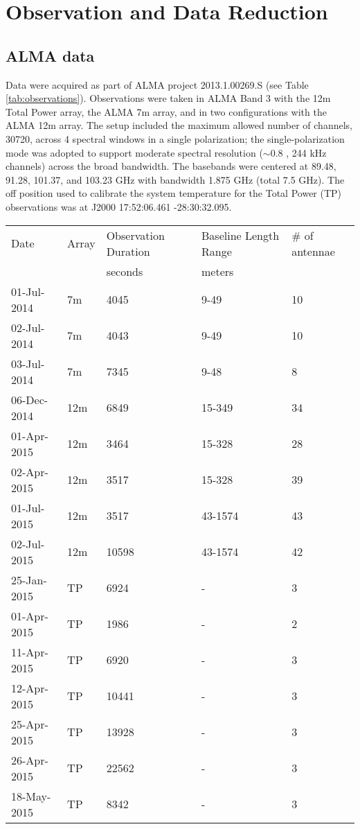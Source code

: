 \documentclass[twocolumn]{aastex61}
\begin{document}
\section{Observation and Data Reduction}
\label{sec:observations}
\subsection{ALMA data}
Data were acquired as part of ALMA project 2013.1.00269.S (see Table
\ref{tab:observations}).  Observations were taken in ALMA Band 3 with the 12m
Total Power array, the ALMA 7m array, and in two
configurations with the ALMA 12m array.  The setup included the maximum allowed
number of channels, 30720, across 4 spectral windows in a single polarization;
the single-polarization mode was adopted to support moderate spectral
resolution ($\sim0.8$ \kms, 244 kHz channels) across the broad bandwidth.  The
basebands were centered at 89.48, 91.28, 101.37, and 103.23 GHz with bandwidth
1.875 GHz (total 7.5 GHz).  The off position used to calibrate the system
temperature for the Total Power (TP) observations was at J2000 17:52:06.461
-28:30:32.095.


\begin{table*}[htp]
\centering
\caption{Observation Summary}
\begin{tabular}{lllll}
\label{tab:observations}
Date & Array & Observation Duration &  Baseline Length Range  & \# of antennae\\
     &       & seconds              & meters                    & \\
\hline
01-Jul-2014 & 7m & 4045 & 9-49 & 10\\
02-Jul-2014 & 7m & 4043 & 9-49 & 10\\
03-Jul-2014 & 7m & 7345 & 9-48 & 8\\
06-Dec-2014 & 12m & 6849 & 15-349 & 34\\
01-Apr-2015 & 12m & 3464 & 15-328 & 28\\
02-Apr-2015 & 12m & 3517 & 15-328 & 39\\
01-Jul-2015 & 12m & 3517 & 43-1574 & 43\\
02-Jul-2015 & 12m & 10598 & 43-1574 & 42\\

\hline

25-Jan-2015 & TP & 6924  & - & 3\\
01-Apr-2015 & TP & 1986  & - & 2\\
11-Apr-2015 & TP & 6920  & - & 3\\
12-Apr-2015 & TP & 10441 & - & 3\\
25-Apr-2015 & TP & 13928 & - & 3\\
26-Apr-2015 & TP & 22562 & - & 3\\
18-May-2015 & TP & 8342  & - & 3\\
\hline
\end{tabular}
\end{table*}
\end{document}
